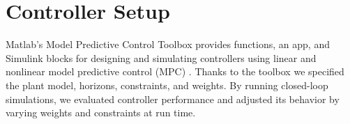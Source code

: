 \section{Controller Setup}
\label{chap:Controller}



Matlab's Model Predictive Control Toolbox provides functions, an app, and Simulink blocks for designing and simulating controllers using linear and nonlinear model predictive control (MPC) \cite{MPCToolbox}. Thanks to the toolbox we specified the plant model, horizons, constraints, and weights. By running closed-loop simulations, we evaluated controller performance and adjusted its behavior by varying weights and constraints at run time.

